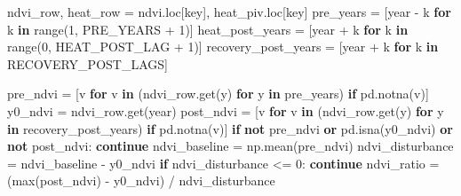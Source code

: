\documentclass[
  letterpaper,
  DIV=11,
  numbers=noendperiod]{scrartcl}
\newenvironment{Shaded}{\begin{snugshade}}{\end{snugshade}}
\newcommand{\BuiltInTok}[1]{\textcolor[rgb]{0.00,0.23,0.31}{#1}}
\newcommand{\ControlFlowTok}[1]{\textcolor[rgb]{0.00,0.23,0.31}{\textbf{#1}}}
\newcommand{\DecValTok}[1]{\textcolor[rgb]{0.68,0.00,0.00}{#1}}
\newcommand{\KeywordTok}[1]{\textcolor[rgb]{0.00,0.23,0.31}{\textbf{#1}}}
\newcommand{\NormalTok}[1]{\textcolor[rgb]{0.00,0.23,0.31}{#1}}
\newcommand{\OperatorTok}[1]{\textcolor[rgb]{0.37,0.37,0.37}{#1}}
\begin{document}
\begin{Shaded}
\begin{Highlighting}[]
\NormalTok{    ndvi\_row, heat\_row }\OperatorTok{=}\NormalTok{ ndvi.loc[key], heat\_piv.loc[key]}
\NormalTok{    pre\_years }\OperatorTok{=}\NormalTok{ [year }\OperatorTok{{-}}\NormalTok{ k }\ControlFlowTok{for}\NormalTok{ k }\KeywordTok{in} \BuiltInTok{range}\NormalTok{(}\DecValTok{1}\NormalTok{, PRE\_YEARS }\OperatorTok{+} \DecValTok{1}\NormalTok{)]}
\NormalTok{    heat\_post\_years }\OperatorTok{=}\NormalTok{ [year }\OperatorTok{+}\NormalTok{ k }\ControlFlowTok{for}\NormalTok{ k }\KeywordTok{in} \BuiltInTok{range}\NormalTok{(}\DecValTok{0}\NormalTok{, HEAT\_POST\_LAG }\OperatorTok{+} \DecValTok{1}\NormalTok{)]}
\NormalTok{    recovery\_post\_years }\OperatorTok{=}\NormalTok{ [year }\OperatorTok{+}\NormalTok{ k }\ControlFlowTok{for}\NormalTok{ k }\KeywordTok{in}\NormalTok{ RECOVERY\_POST\_LAGS]}

\NormalTok{    pre\_ndvi }\OperatorTok{=}\NormalTok{ [v }\ControlFlowTok{for}\NormalTok{ v }\KeywordTok{in}\NormalTok{ (ndvi\_row.get(y) }\ControlFlowTok{for}\NormalTok{ y }\KeywordTok{in}\NormalTok{ pre\_years) }\ControlFlowTok{if}\NormalTok{ pd.notna(v)]}
\NormalTok{    y0\_ndvi }\OperatorTok{=}\NormalTok{ ndvi\_row.get(year)}
\NormalTok{    post\_ndvi }\OperatorTok{=}\NormalTok{ [v }\ControlFlowTok{for}\NormalTok{ v }\KeywordTok{in}\NormalTok{ (ndvi\_row.get(y) }\ControlFlowTok{for}\NormalTok{ y }\KeywordTok{in}\NormalTok{ recovery\_post\_years) }\ControlFlowTok{if}\NormalTok{ pd.notna(v)]}
    \ControlFlowTok{if} \KeywordTok{not}\NormalTok{ pre\_ndvi }\KeywordTok{or}\NormalTok{ pd.isna(y0\_ndvi) }\KeywordTok{or} \KeywordTok{not}\NormalTok{ post\_ndvi:}
        \ControlFlowTok{continue}
\NormalTok{    ndvi\_baseline }\OperatorTok{=}\NormalTok{ np.mean(pre\_ndvi)}
\NormalTok{    ndvi\_disturbance }\OperatorTok{=}\NormalTok{ ndvi\_baseline }\OperatorTok{{-}}\NormalTok{ y0\_ndvi}
    \ControlFlowTok{if}\NormalTok{ ndvi\_disturbance }\OperatorTok{\textless{}=} \DecValTok{0}\NormalTok{:}
        \ControlFlowTok{continue}
\NormalTok{    ndvi\_ratio }\OperatorTok{=}\NormalTok{ (}\BuiltInTok{max}\NormalTok{(post\_ndvi) }\OperatorTok{{-}}\NormalTok{ y0\_ndvi) }\OperatorTok{/}\NormalTok{ ndvi\_disturbance}


\end{Highlighting}
\end{Shaded}
\end{document}

